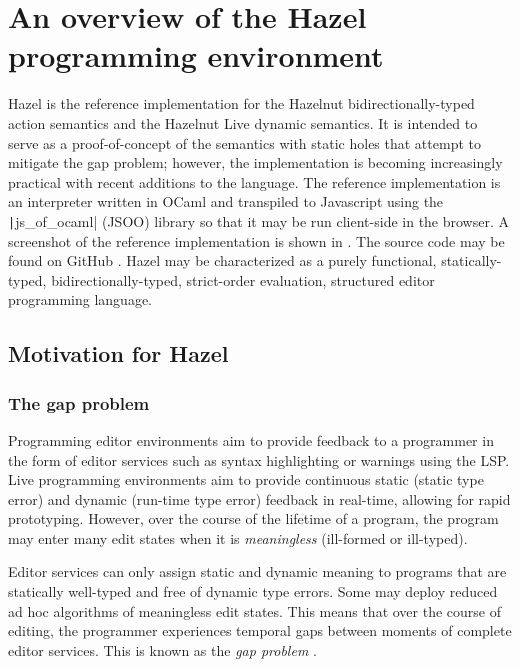 \chapter{An overview of the Hazel programming environment}
\label{sec:hazel}

Hazel is the reference implementation for the Hazelnut bidirectionally-typed action semantics and the Hazelnut Live dynamic semantics. It is intended to serve as a proof-of-concept of the semantics with static holes that attempt to mitigate the gap problem; however, the implementation is becoming increasingly practical with recent additions to the language. The reference implementation is an interpreter written in OCaml and transpiled to Javascript using the \texttt|js_of_ocaml| (JSOO) library \cite{vouillon2014bytecode} so that it may be run client-side in the browser. A screenshot of the reference implementation is shown in  \cite{HazelDemo2022}. The source code may be found on GitHub \cite{Hazel2022}. Hazel may be characterized as a purely functional, statically-typed, bidirectionally-typed, strict-order evaluation, structured editor programming language.

\section{Motivation for Hazel}
\label{sec:hazel-motivation}

\subsection{The gap problem}
\label{sec:gap-problem}

Programming editor environments aim to provide feedback to a programmer in the form of editor services such as syntax highlighting or warnings using the LSP. Live programming environments aim to provide continuous static (static type error) and dynamic (run-time type error) feedback in real-time, allowing for rapid prototyping. However, over the course of the lifetime of a program, the program may enter many edit states when it is \textit{meaningless} (ill-formed or ill-typed).

Editor services can only assign static and dynamic meaning to programs that are statically well-typed and free of dynamic type errors. Some may deploy reduced ad hoc algorithms of meaningless edit states. This means that over the course of editing, the programmer experiences temporal gaps between moments of complete editor services. This is known as the \textit{gap problem} \cite{10.1145/2499370.2462170,conf/popl/HazelnutLive19}.

